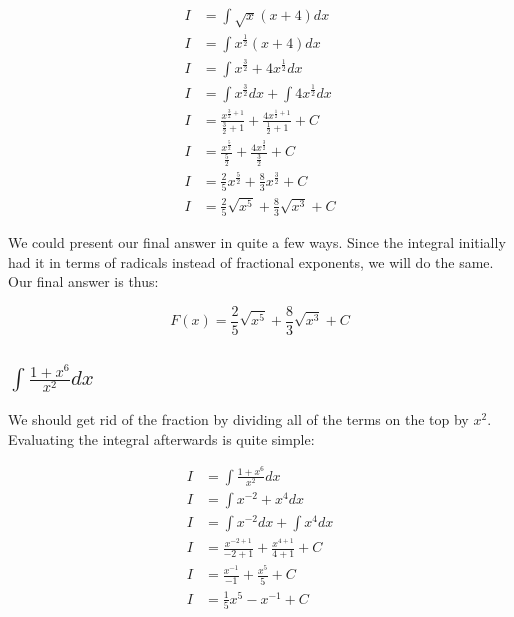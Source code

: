 \documentclass[12pt]{article}
\begin{document}
\begin{align}
    I & = \int \sqrt{x}(x+4) dx                                                                  \\
    I & = \int x^{\frac{1}{2}}(x+4) dx                                                           \\
    I & = \int x^{\frac{3}{2}} + 4x^{\frac{1}{2}} dx                                             \\
    I & = \int x^{\frac{3}{2}} dx + \int 4x^{\frac{1}{2}} dx                                     \\
    I & = \frac{x^{\frac{3}{2}+1}}{\frac{3}{2}+1} + \frac{4x^{\frac{1}{2}+1}}{\frac{1}{2}+1} + C \\
    I & = \frac{x^{\frac{5}{2}}}{\frac{5}{2}} + \frac{4x^{\frac{3}{2}}}{\frac{3}{2}} + C         \\
    I & = \frac{2}{5}x^{\frac{5}{2}} + \frac{8}{3}x^{\frac{3}{2}} + C                            \\
    I & = \frac{2}{5}\sqrt{x^5} + \frac{8}{3}\sqrt{x^3} + C
\end{align}


We could present our final answer in quite a few ways. Since the integral initially had it in terms of radicals instead of fractional exponents, we will do the same. Our final answer is thus:

$$
    F(x) = \frac{2}{5}\sqrt{x^5} + \frac{8}{3}\sqrt{x^3} + C
$$

\subsection{$\int \frac{1+x^6}{x^2} dx$}

We should get rid of the fraction by dividing all of the terms on the top by $x^2$. Evaluating the integral afterwards is quite simple:


\begin{align}
    I & = \int \frac{1+x^6}{x^2} dx                       \\
    I & = \int x^{-2} + x^4 dx                            \\
    I & = \int x^{-2} dx + \int x^4 dx                    \\
    I & = \frac{x^{-2+1}}{-2+1} + \frac{x^{4+1}}{4+1} + C \\
    I & = \frac{x^{-1}}{-1} + \frac{x^{5}}{5} + C         \\
    I & = \frac{1}{5} x^{5} -{x^{-1}} + C
\end{align}
\end{document}
